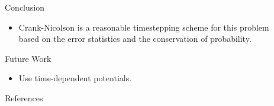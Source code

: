 \documentclass[final]{beamer}
\newlength{\sepwid}
\newlength{\onecolwid}
\newlength{\twocolwid}
\begin{document}
\begin{frame}[t]
\begin{columns}[t]
\begin{column}{\twocolwid}
\begin{columns}[t,totalwidth=\twocolwid]




\end{columns} %

\end{column} %

\begin{column}{\sepwid}\end{column} %

\begin{column}{\onecolwid} %


\begin{block}{Conclusion}

\begin{itemize}
\item Crank-Nicolson is a reasonable timestepping scheme for this problem based on the error statistics and the conservation of probability.
\end{itemize}

\end{block}


\begin{block}{Future Work}

\begin{itemize}
\item Use time-dependent potentials.
\end{itemize}

\end{block}


\begin{block}{References}


\end{block}
\end{column}
\end{columns}
\end{frame}
\end{document}
